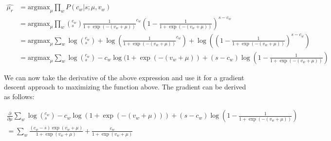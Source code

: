 \documentclass[11pt]{article}
\begin{document}
\begin{align}
  \hat{\mu_r} &= \mathrm{argmax}_{\mu} \prod_w P(c_w | s; \mu, v_w) \\
  &= \mathrm{argmax}_{\mu} \prod_w   ({}^{c_w}_{s}) \frac{1}{1+\exp(-(v_w+\mu))}^{c_w} (1- \frac{1}{ 1+\exp(-(v_w+\mu))})^{s-c_w} \\
  &= \mathrm{argmax}_{\mu} \sum_w \log({}^{c_w}_{s})  + \log(\frac{1}{1+ \exp(-(v_w+\mu))}^{c_w}) + \log( (1- \frac{1}{ 1+ \exp(-(v_w+\mu))})^{s-c_w}) \\
  &= \mathrm{argmax}_{\mu}  \sum_w \log({}^{c_w}_{s})  - c_w \log(1+ \exp(-(v_w+\mu)) + (s-c_w) \log (1- \frac{1}{ 1+ \exp(-(v_w+\mu))})
\end{align}

We can now take the derivative of the above expression and use it for a gradient descent approach to maximizing the function above.  The gradient can be derived as follows:

\begin{align}
 \frac{\partial}{\partial \mu} \sum_w \log({}^{c_w}_{s})  - c_w \log(1+ \exp(-(v_w+\mu))) + (s-c_w) \log (1- \frac{1}{ 1+ \exp(-(v_w+\mu))}) \\
  =  \sum_w \frac{(c_w-s) \exp(v_w+\mu)}{ 1+ \exp(v_w+\mu)} +\frac{c_w}{1+ \exp(v_w+\mu)}  
\end{align}



%
%
\end{document}
